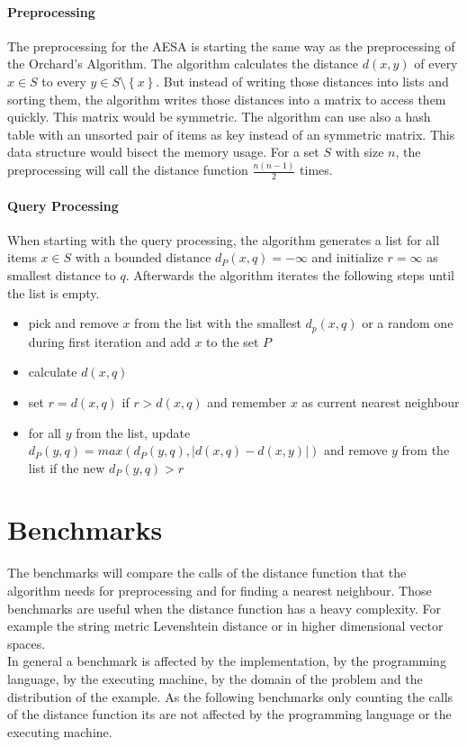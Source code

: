 \documentclass[runningheads,a4paper]{llncs}
\begin{document}
\paragraph{Preprocessing}

The preprocessing for the AESA is starting the same way as the preprocessing of the Orchard’s Algorithm. The algorithm
calculates the distance $d(x, y)$ of every $x \in S$ to every $y \in S\setminus\left\{ {x}\right\}$. But instead of
writing those distances into lists and sorting them, the algorithm writes those distances into a matrix to access them
quickly. This matrix would be symmetric. The algorithm can use also a hash table with an unsorted pair of items as key
instead of an symmetric matrix. This data structure would bisect the memory usage. For a set $S$ with size $n$, the
preprocessing will call the distance function $\frac{n(n-1)}{2}$ times.

\paragraph{Query Processing}

When starting with the query processing, the algorithm generates a list for all items $x \in S$ with a bounded
distance $d_P(x, q) = -\infty$ and initialize $r = \infty$ as smallest distance to $q$. Afterwards the algorithm
iterates the following steps until the list is empty.
\begin{itemize}
	\item pick and remove $x$ from the list with the smallest $d_p(x, q)$ or a random one during first iteration and add
		$x$ to the set $P$
	\item calculate $d(x, q)$
	\item set $r = d(x, q)$ if $r > d(x, q)$ and remember $x$ as current nearest neighbour
	\item for all $y$ from the list, update $d_P(y, q) = max(d_P(y, q), |d(x, q) - d(x, y)|)$ and remove $y$ from the
		list if the new $d_P(y, q) > r$
\end{itemize}

\section{Benchmarks}

The benchmarks will compare the calls of the distance function that the algorithm needs for preprocessing and for
finding a nearest neighbour. Those benchmarks are useful when the distance function has a heavy complexity. For example
the string metric Levenshtein distance or in higher dimensional vector spaces.\\
In general a benchmark is affected by the implementation, by the programming language, by the executing machine, by the
domain of the problem and the distribution of the example. As the following benchmarks only counting the calls of the
distance function its are not affected by the programming language or the executing machine.
\end{document}
